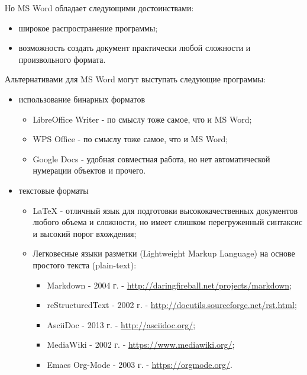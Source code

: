 \documentclass[
  a4paper,
]{book}
\providecommand{\tightlist}{%
  \setlength{\itemsep}{0pt}\setlength{\parskip}{0pt}}
\theoremstyle{definition}
\theoremstyle{definition}
\theoremstyle{definition}
\theoremstyle{definition}
\theoremstyle{remark}
\begin{document}
Но MS Word обладает следующими достоинствами:

\begin{itemize}
\tightlist
\item
  широкое распространение программы;
\item
  возможность создать документ практически любой сложности и произвольного формата.
\end{itemize}

Альтернативами для MS Word могут выступать следующие программы:

\begin{itemize}
\item
  использование бинарных форматов

  \begin{itemize}
  \tightlist
  \item
    LibreOffice Writer - по смыслу тоже самое, что и MS Word;
  \item
    WPS Office - по смыслу тоже самое, что и MS Word;
  \item
    Google Docs - удобная совместная работа, но нет автоматической нумерации объектов и прочего.
  \end{itemize}
\item
  текстовые форматы

  \begin{itemize}
  \item
    LaTeX - отличный язык для подготовки высококачественных документов любого объема и сложности, но имеет слишком перегруженный синтаксис и высокий порог вхождения;
  \item
    Легковесные языки разметки (Lightweight Markup Language) на основе простого текста (plain-text):

    \begin{itemize}
    \tightlist
    \item
      Markdown - 2004 г. - \url{http://daringfireball.net/projects/markdown};
    \item
      reStructuredText - 2002 г. - \url{http://docutils.sourceforge.net/rst.html};
    \item
      AsciiDoc - 2013 г. - \url{http://asciidoc.org/};
    \item
      MediaWiki - 2002 г. - \url{https://www.mediawiki.org/};
    \item
      Emacs Org-Mode - 2003 г. - \url{https://orgmode.org/}.
    \end{itemize}
  \end{itemize}
\end{itemize}
\end{document}
